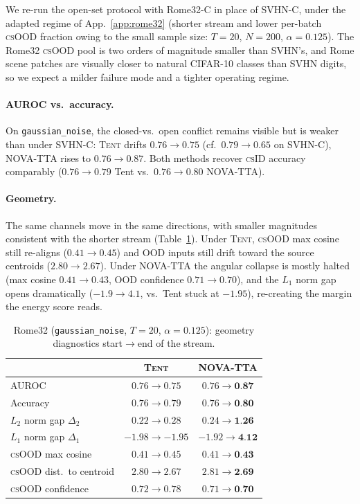 \documentclass[11pt]{article}
\newcommand{\csid}{\textsc{cs}ID}
\newcommand{\csood}{\textsc{cs}OOD}
\newcommand{\method}[1]{\textsc{#1}}
\begin{document}
We re-run the open-set protocol with Rome32-C in place of SVHN-C, under the
adapted regime of App.~\ref{app:rome32} (shorter stream and lower per-batch
\csood{} fraction owing to the small sample size: $T{=}20$, $N{=}200$,
$\alpha{=}0.125$). The Rome32 \csood{} pool is two orders of magnitude smaller
than SVHN's, and Rome scene patches are visually closer to natural CIFAR-10
classes than SVHN digits, so we expect a milder failure mode and a tighter
operating regime.

\paragraph{AUROC vs.\ accuracy.} On \texttt{gaussian\_noise}, the closed-vs.\
open conflict remains visible but is weaker than under SVHN-C: \method{Tent}
drifts $0.76\!\to\!0.75$ (cf.\ $0.79\!\to\!0.65$ on SVHN-C),
\method{NOVA-TTA} rises to $0.76\!\to\!0.87$. Both methods recover \csid{}
accuracy comparably ($0.76\!\to\!0.79$ Tent vs.\ $0.76\!\to\!0.80$
\method{NOVA-TTA}).

\paragraph{Geometry.} The same channels move in the same directions, with
smaller magnitudes consistent with the shorter stream
(Table~\ref{tab:rome32-geom}). Under \method{Tent}, \csood{} max cosine still
re-aligns ($0.41\!\to\!0.45$) and OOD inputs still drift toward the source
centroids ($2.80\!\to\!2.67$). Under \method{NOVA-TTA} the angular collapse
is mostly halted (max cosine $0.41\!\to\!0.43$, OOD confidence
$0.71\!\to\!0.70$), and the $L_1$ norm gap opens dramatically
($-1.9\!\to\!4.1$, vs.\ Tent stuck at $-1.95$), re-creating the margin the
energy score reads.

\begin{table}[h]
  \centering
  \small
  \caption{Rome32 (\texttt{gaussian\_noise}, $T{=}20$, $\alpha{=}0.125$):
  geometry diagnostics start$\to$end of the stream.}
  \label{tab:rome32-geom}
  \begin{tabular}{lcc}
    \toprule
                                & \method{Tent} & \method{NOVA-TTA}\\
    \midrule
    AUROC                       & $0.76\to0.75$ & $0.76\to\textbf{0.87}$\\
    Accuracy                    & $0.76\to0.79$ & $0.76\to\textbf{0.80}$\\
    $L_2$ norm gap $\Delta_2$   & $0.22\to0.28$ & $0.24\to\textbf{1.26}$\\
    $L_1$ norm gap $\Delta_1$   & $-1.98\to-1.95$ & $-1.92\to\textbf{4.12}$\\
    \csood{} max cosine         & $0.41\to0.45$ & $0.41\to\textbf{0.43}$\\
    \csood{} dist.\ to centroid & $2.80\to2.67$ & $2.81\to\textbf{2.69}$\\
    \csood{} confidence         & $0.72\to0.78$ & $0.71\to\textbf{0.70}$\\
    \bottomrule
  \end{tabular}
\end{table}
\end{document}
